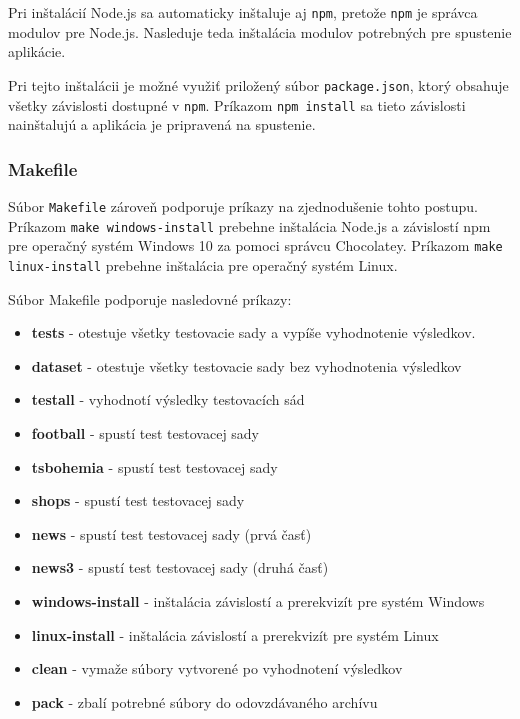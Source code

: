 Pri inštalácií Node.js sa automaticky inštaluje aj \texttt{npm}, pretože \texttt{npm} je správca modulov pre Node.js. Nasleduje teda inštalácia modulov potrebných pre spustenie aplikácie.

Pri tejto inštalácii je možné využiť priložený súbor \texttt{package.json}, ktorý obsahuje všetky závislosti dostupné v \texttt{npm}. Príkazom \texttt{npm install} sa tieto závislosti nainštalujú a aplikácia je pripravená na spustenie.

\newpage

\subsubsection{Makefile}

Súbor \texttt{Makefile} zároveň podporuje príkazy na zjednodušenie tohto postupu. Príkazom \texttt{make windows-install} prebehne inštalácia Node.js a závislostí npm pre operačný systém Windows 10 za pomoci správcu Chocolatey. Príkazom \texttt{make linux-install} prebehne inštalácia pre operačný systém Linux.

Súbor Makefile podporuje nasledovné príkazy:

\begin{itemize}
    \item \textbf{tests} - otestuje všetky testovacie sady a vypíše vyhodnotenie výsledkov.
    \item \textbf{dataset} - otestuje všetky testovacie sady bez vyhodnotenia výsledkov
    \item \textbf{testall} - vyhodnotí výsledky testovacích sád
    \item \textbf{football} - spustí test testovacej sady 
    \item \textbf{tsbohemia} - spustí test testovacej sady 
    \item \textbf{shops} - spustí test testovacej sady 
    \item \textbf{news} - spustí test testovacej sady  (prvá časť)
    \item \textbf{news3} - spustí test testovacej sady  (druhá časť)
    \item \textbf{windows-install} - inštalácia závislostí a prerekvizít pre systém Windows
    \item \textbf{linux-install} - inštalácia závislostí a prerekvizít pre systém Linux
    \item \textbf{clean} - vymaže súbory vytvorené po vyhodnotení výsledkov
    \item \textbf{pack} - zbalí potrebné súbory do odovzdávaného archívu
\end{itemize}

